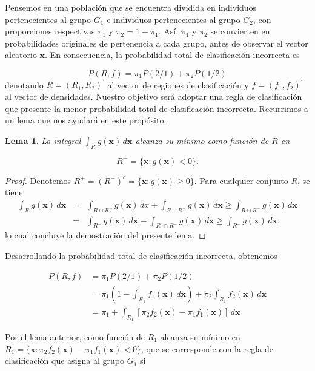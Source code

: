 \documentclass[
  a4paper,
  oneside]{scrbook}
\newtheorem{lemma}{Lema}[chapter]
\theoremstyle{definition}
\theoremstyle{definition}
\theoremstyle{definition}
\theoremstyle{definition}
\theoremstyle{remark}
\begin{document}
Pensemos en una población que se encuentra dividida en individuos
pertenecientes al grupo \(G_1\) e individuos pertenecientes al grupo
\(G_2\), con proporciones respectivas \(\pi_1\) y \(\pi_2=1-\pi_1\). Así,
\(\pi_1\) y \(\pi_2\) se convierten en probabilidades originales de
pertenencia a cada grupo, antes de observar el vector aleatorio
\(\bm{x}\). En consecuencia, la probabilidad total de clasificación
incorrecta es

\[P(R,f)=\pi_1 P(2/1) + \pi_2 P(1/2)\] denotando
\({R}=(R_1,R_2)^{\prime}\) al vector de regiones de clasificación y
\({f}=(f_1,f_2)^{\prime}\) al vector de densidades. Nuestro objetivo será
adoptar una regla de clasificación que presente la menor probabilidad
total de clasificación incorrecta. Recurrimos a un lema que nos ayudará
en este propósito.

\begin{lemma}
\protect\hypertarget{lem:unnamed-chunk-95}{}\label{lem:unnamed-chunk-95}La integral \(\int_{{R}} g(\bm{x})\,d\bm{x}\) alcanza su mínimo como
función de \({R}\) en

\[R^-=\{\bm{x}: g(\bm{x})<0\}.\]
\end{lemma}

\begin{proof}
Denotemos \(R^+=(R^-)^c=\{\bm{x}:g(\bm{x})\geq 0\}\). Para
cualquier conjunto \(R\), se tiene \[\begin{aligned}
\int_R g(\bm{x})\,d\bm{x} & = & \int_{R\cap R^-} g(\bm{x})\,dx + \int_{R\cap R^+} g(\bm{x})\,d\bm{x}
\geq  \int_{R\cap R^-} g(\bm{x})\,d\bm{x} \\
& = & \int_{R^-} g(\bm{x})\,d\bm{x} - \int_{R^c\cap R^-} g(\bm{x})\,d\bm{x}
\geq \int_{R^-} g(\bm{x})\,d\bm{x},\end{aligned}\] lo cual concluye la
demostración del presente lema.
\end{proof}

Desarrollando la probabilidad total de clasificación incorrecta,
obtenemos

\[\begin{aligned}
P({R},{f})&=\pi_1P(2/1)+\pi_2P(1/2)\\
&=\pi_1 (1-\int_{R_1} f_1(\bm{x})\,d\bm{x})
+\pi_2\int_{R_1} f_2(\bm{x})\,d\bm{x} \\
&= \pi_1+\int_{R_1} [\pi_2 f_2(\bm{x})-\pi_1 f_1(\bm{x})]\,d\bm{x}\end{aligned}\]

Por el lema anterior, como función de \(R_1\) alcanza su mínimo en
\(R_1=\{\bm{x}:\pi_2 f_2(\bm{x})-\pi_1 f_1(\bm{x})<0\}\), que se
corresponde con la regla de clasificación que asigna al grupo \(G_1\) si
\end{document}
